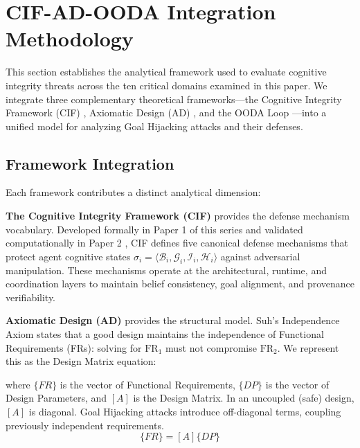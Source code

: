 \documentclass[
]{article}
\begin{document}
\newpage

\section{CIF-AD-OODA Integration Methodology}\label{sec:methodology}

This section establishes the analytical framework used to evaluate
cognitive integrity threats across the ten critical domains examined in
this paper. We integrate three complementary theoretical
frameworks---the Cognitive Integrity Framework (CIF)
\cite{friedman2026cogsec1}, Axiomatic Design (AD)
\cite{suh1990principles, suh2001axiomatic}, and the OODA Loop
\cite{boyd1987patterns}---into a unified model for analyzing Goal
Hijacking attacks and their defenses.

\subsection{Framework Integration}\label{framework-integration}

Each framework contributes a distinct analytical dimension:

\textbf{The Cognitive Integrity Framework (CIF)} provides the defense
mechanism vocabulary. Developed formally in Paper 1 of this series
\cite{friedman2026cogsec1} and validated computationally in Paper 2
\cite{friedman2026cogsec2}, CIF defines five canonical defense
mechanisms that protect agent cognitive states
\(\sigma_i = \langle \mathcal{B}_i, \mathcal{G}_i, \mathcal{I}_i, \mathcal{H}_i \rangle\)
against adversarial manipulation. These mechanisms operate at the
architectural, runtime, and coordination layers to maintain belief
consistency, goal alignment, and provenance verifiability.

\textbf{Axiomatic Design (AD)} provides the structural model. Suh's
Independence Axiom \cite{suh2001axiomatic} states that a good design
maintains the independence of Functional Requirements (FRs): solving for
\(\text{FR}_1\) must not compromise \(\text{FR}_2\). We represent this
as the Design Matrix equation:

where \(\{FR\}\) is the vector of Functional Requirements, \(\{DP\}\) is
the vector of Design Parameters, and \([A]\) is the Design Matrix. In an
uncoupled (safe) design, \([A]\) is diagonal. Goal Hijacking attacks
introduce off-diagonal terms, coupling previously independent
requirements. \begin{equation}
\{FR\} = [A]\{DP\}
\label{eq:meth_design_matrix}
\end{equation}
\end{document}
